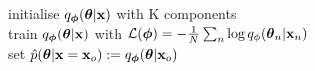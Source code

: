 \documentclass{standalone}
\begin{document}
\begin{varwidth}{\linewidth}
\par\noindent
\begin{algorithm}[H]
  \DontPrintSemicolon
  initialise $\qphi$ with K components \\
  \BlankLine
    \BlankLine
    train $\qphi$ with $\loss(\bphi) = - \frac{1}{N} \sum_n \log q_{\phi}(\btheta_n|\bx_n)$ \\
    \BlankLine
    set $\approxposteriorxo := q_{\bphi}(\btheta|\bx_o)$ \\
    \BlankLine
\end{algorithm}
\end{varwidth}
\end{document}
